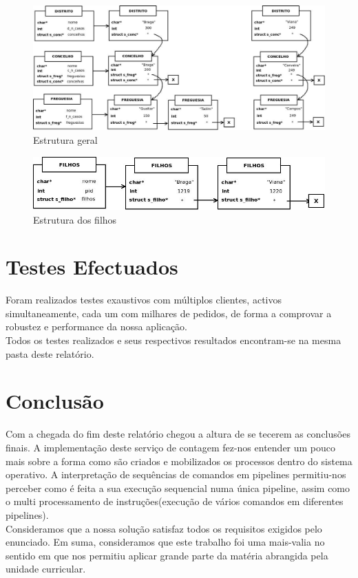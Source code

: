 \documentclass[10pt,notitlepage]{article}
\begin{document}
\begin{figure}[h]
\centering
\includegraphics[scale=0.45]{StructsDistConcFreg.jpeg}
\caption{Estrutura geral}
\end{figure}



\begin{figure}[h]
\centering
\includegraphics[scale=0.45]{StructsFilhos.jpeg}
\caption{Estrutura dos filhos}
\end{figure}



\section{Testes Efectuados}

Foram realizados testes exaustivos com múltiplos clientes, activos simultaneamente, cada um com milhares de pedidos, de forma a comprovar a robustez e performance da nossa aplicação.\\
Todos os testes realizados e seus respectivos resultados encontram-se na mesma pasta deste relatório.











\section{Conclusão}
Com a chegada do fim deste relatório chegou a altura de se tecerem as conclusões finais.
A implementação deste serviço de contagem fez-nos entender um pouco mais sobre a forma como são criados e mobilizados os processos dentro do sistema operativo. A interpretação de sequências de comandos em pipelines permitiu-nos perceber como é feita a sua execução sequencial numa única
pipeline, assim como o multi processamento de instruções(execução de vários comandos em diferentes pipelines).\\
Consideramos que a nossa solução satisfaz todos os requisitos exigidos pelo enunciado.
Em suma, consideramos que este trabalho foi uma mais-valia no sentido em que nos permitiu
aplicar grande parte da matéria abrangida pela unidade curricular.






 
\end{document}

